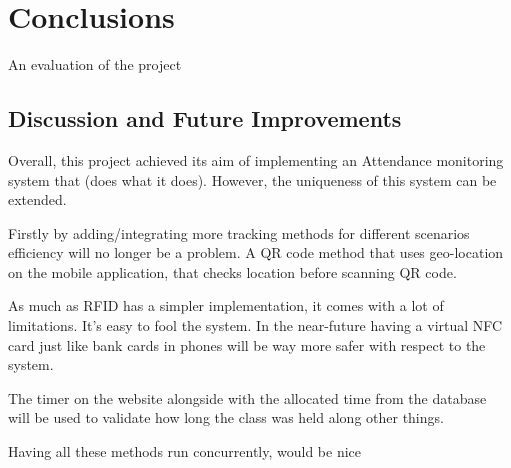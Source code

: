 \chapter{Conclusions}
An evaluation of the project

\section{Discussion and Future Improvements}

Overall, this project achieved its aim of implementing an Attendance monitoring system that (does what it does). However, the uniqueness of this system can be extended.

Firstly by adding/integrating more tracking methods for different scenarios efficiency will no longer be a problem.
A QR code method that uses geo-location on the mobile application, that checks location before scanning QR code.

As much as RFID has a simpler implementation, it comes with a lot of limitations. It's easy to fool the system. In the near-future having a virtual NFC card just like bank cards in phones will be way more safer with respect to the system.

The timer on the website alongside with the allocated time from the database will be used to validate how long the class was held along other things.

Having all these methods run concurrently, would be nice
